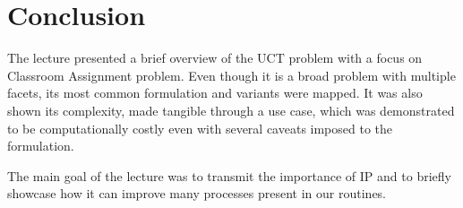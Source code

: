 \section{Conclusion}

The lecture presented a brief overview of the UCT problem with a focus on Classroom Assignment problem. Even though it is a broad problem with multiple facets, its most common formulation and variants were mapped. It was also shown its complexity, made tangible through a use case, which was demonstrated to be computationally costly even with several caveats imposed to the formulation.

The main goal of the lecture was to transmit the importance of IP and to briefly showcase how it can improve many processes present in our routines.

